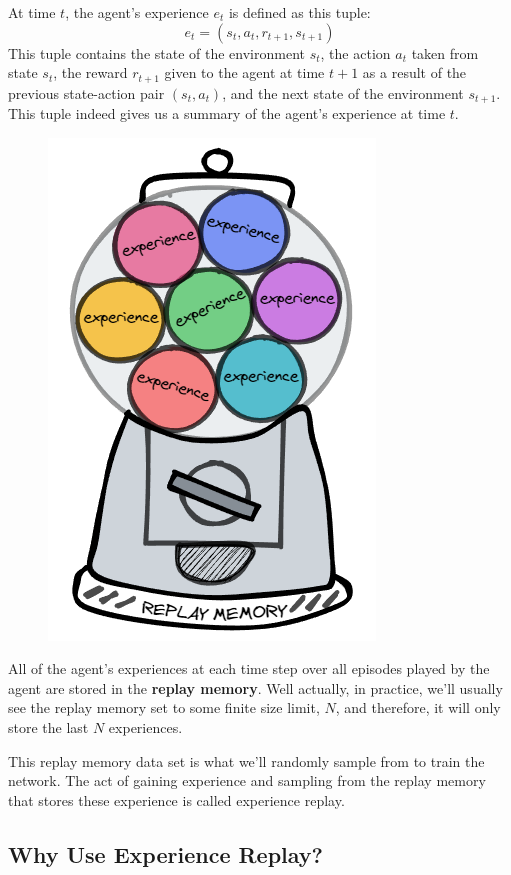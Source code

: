 At time $t$, the agent's experience $e_t$ is defined as this tuple:
$$
e_t = (s_t, a_t, r_{t+1}, s_{t+1})
$$
\noindent{}This tuple contains the state of the environment $s_t$, the action $a_t$ 
taken from state $s_t$, the reward $r_{t+1}$ given to the agent at time $t+1$ as a 
result of the previous state-action pair $(s_t, a_t)$, and the next state of the 
environment $s_{t+1}$. This tuple indeed gives us a summary of the agent's experience 
at time $t$.

\begin{figure}[h]
\centering
\includegraphics[scale=0.618]{pix/q_learning/replay_memory.png}
\end{figure}

All of the agent's experiences at each time step over all episodes played by the agent 
are stored in the {\bf replay memory}. Well actually, in practice, we'll usually see the 
replay memory set to some finite size limit, $N$, and therefore, it will only store the 
last $N$ experiences.

This replay memory data set is what we'll randomly sample from to train the network. The 
act of gaining experience and sampling from the replay memory that stores these experience 
is called experience replay.

\subsection{Why Use Experience Replay?}


